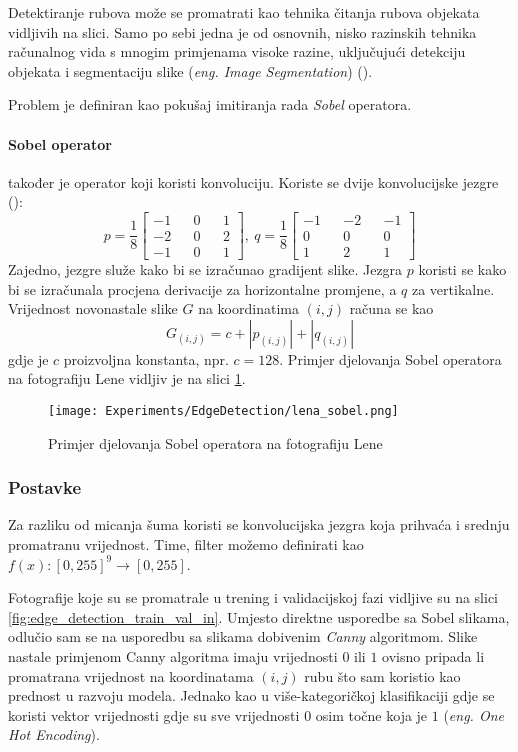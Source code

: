 Detektiranje rubova može se promatrati kao tehnika čitanja rubova objekata vidljivih na slici.
Samo po sebi jedna je od osnovnih, nisko razinskih tehnika računalnog vida s mnogim primjenama visoke razine, uključujući detekciju objekata i segmentaciju slike (\emph{eng. Image Segmentation}) (\cite{Liu_2019}).

Problem je definiran kao pokušaj imitiranja rada \emph{Sobel} operatora.

 \paragraph{Sobel operator} također je operator koji koristi konvoluciju.
 Koriste se dvije konvolucijske jezgre (\cite{Sekanina2011}):
 \[
	 p = \frac{1}{8}
	 \begin{bmatrix}
		 -1 && 0 && 1 \\
		 -2 && 0 && 2 \\
		 -1 && 0 && 1
	 \end{bmatrix}
	 ,\ 
	 q = \frac{1}{8}
	 \begin{bmatrix}
		 -1 && -2 && -1 \\
		 0 && 0 && 0 \\
		 1 && 2 && 1
	 \end{bmatrix}
 \]
Zajedno, jezgre služe kako bi se izračunao gradijent slike.
Jezgra $p$ koristi se kako bi se izračunala procjena derivacije za horizontalne promjene, a $q$ za vertikalne. \\
Vrijednost novonastale slike $G$ na koordinatima $(i, j)$ računa se kao
$$
G_{(i, j)} = c + |p_{(i, j)}| + |q_{(i, j)}|
$$
gdje je $c$ proizvoljna konstanta, npr. $c = 128$.
Primjer djelovanja Sobel operatora na fotografiju Lene vidljiv je na slici \ref{fig:lena_sobel}.

\begin{figure}
	\centering
	\texttt{[image: Experiments/EdgeDetection/lena\_sobel.png]}
	\caption{Primjer djelovanja Sobel operatora na fotografiju Lene}
	\label{fig:lena_sobel}
\end{figure}

\subsubsection{Postavke}
Za razliku od micanja šuma koristi se konvolucijska jezgra koja prihvaća i srednju promatranu vrijednost.
Time, filter možemo definirati kao $f(x): [0, 255]^9 \rightarrow [0, 255]$.

Fotografije koje su se promatrale u trening i validacijskoj fazi vidljive su na slici \ref{fig:edge_detection_train_val_in}.
Umjesto direktne usporedbe sa Sobel slikama, odlučio sam se na usporedbu sa slikama dobivenim \emph{Canny} algoritmom.
Slike nastale primjenom Canny algoritma imaju vrijednosti $0$ ili $1$ ovisno pripada li promatrana vrijednost na koordinatama $(i, j)$ rubu što sam koristio kao prednost u razvoju modela.
Jednako kao u više-kategoričkoj klasifikaciji gdje se koristi vektor vrijednosti gdje su sve vrijednosti $0$ osim točne koja je $1$ (\emph{eng. One Hot Encoding}).

